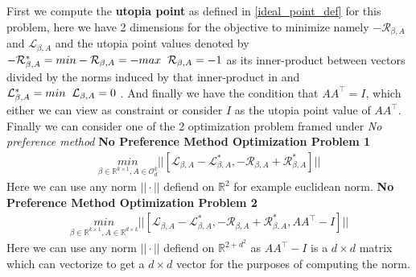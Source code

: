 First we compute the \textbf{utopia point} as defined in \ref{ideal_point_def} for this problem, here we have 2 dimensions for the objective to minimize namely $-\mathcal{R}_{\beta, A}$ and $\mathcal{L}_{\beta, A}$ and the utopia point values denoted by $-\mathcal{R}_{\beta, A}^* = min -\mathcal{R}_{\beta, A}  = - max\hspace{2mm} \mathcal{R}_{\beta, A} =  - 1 $ as its inner-product between vectors divided by the norms induced by that inner-product in and $\mathcal{L}_{\beta, A}^* =min \hspace{2mm} \mathcal{L}_{\beta, A} = 0$ . And finally we have the condition that $AA^\top = I$, which either we can view as constraint or consider $I$ as the utopia point value of $AA^\top$. Finally we can consider one of the 2 optimization problem framed under \textit{No preference method}
\newline \textbf{No Preference Method Optimization Problem 1}
\begin{equation} \label{NPMOP_1:objective}
\begin{aligned}
    \underset{\beta\in \mathbb{R}^{k\times 1},A\in \mathcal{O}^{k}_{d}}{min} || [\mathcal{L}_{\beta, A}-\mathcal{L}_{\beta, A}^*,-\mathcal{R}_{\beta, A}+\mathcal{R}_{\beta, A}^*]||
\end{aligned}
\end{equation}
Here we can use any norm $||\cdot ||$ defiend on $\mathbb{R}^2$ for example euclidean norm.
\hspace{2mm}
\newline \textbf{No Preference Method Optimization Problem 2}
\begin{equation} \label{NPMOP_2:objective}
\begin{aligned}
    \underset{\beta\in \mathbb{R}^{k\times 1},A\in \mathbb{R}^{d\times k}}{min} || [\mathcal{L}_{\beta, A}-\mathcal{L}_{\beta, A}^*,-\mathcal{R}_{\beta, A}+\mathcal{R}_{\beta, A}^*, AA^\top - I]||
\end{aligned}
\end{equation}
Here we can use any norm $||\cdot ||$ defiend on $\mathbb{R}^{2+d^2}$ as $AA^\top -I$ is a $d\times d$ matrix which can vectorize to get a $d\times d$ vector for the purposes of computing the norm.

